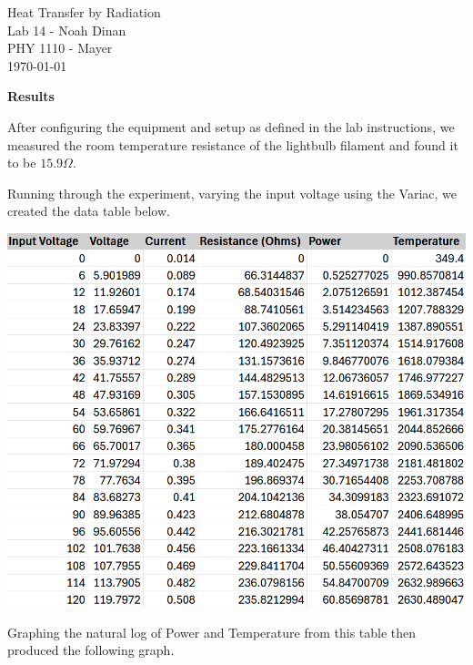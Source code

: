 \documentclass[12pt]{article}
\begin{document}
\begin{center}
\vspace*{\fill}
Heat Transfer by Radiation \\ Lab 14 - Noah Dinan \\ PHY 1110 - Mayer \\ \today \\
\vspace*{\fill}
\end{center}

\newpage
{} %
\setlength{\parindent}{0in}

\textbf{Results}\vspace{1em}

After configuring the equipment and setup as defined in the lab instructions, we measured the
room temperature resistance of the lightbulb filament and found it to be $15.9 \Omega$.

Running through the experiment, varying the input voltage using the Variac, we created the data
table below.

\begin{center}
    \includegraphics[scale=0.5]{table_14.png}
\end{center}

Graphing the natural log of Power and Temperature from this table then produced the following graph.
\end{document}
